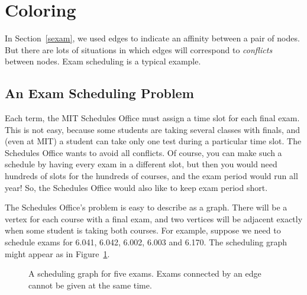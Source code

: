 
\begin{problems}
\practiceproblems
{}

\classproblems
{}

\examproblems
{}

\homeworkproblems
{}
\end{problems}

\section{Coloring}\label{sec:coloring}

In Section~\ref{sexam}, we used edges to indicate an affinity between a
pair of nodes.  But there are lots of situations in which edges will
correspond to \emph{conflicts} between nodes.  Exam scheduling is a
typical example.

\subsection{An Exam Scheduling Problem}

Each term, the MIT Schedules Office must assign a time slot for each
final exam.  This is not easy, because some students are taking
several classes with finals, and (even at MIT) a student can take only
one test during a particular time slot.  The Schedules Office wants to
avoid all conflicts.  Of course, you can make such a schedule by
having every exam in a different slot, but then you would need
hundreds of slots for the hundreds of courses, and the exam period
would run all year!  So, the Schedules Office would also like to keep
exam period short.

The Schedules Office's problem is easy to describe as a graph.  There
will be a vertex for each course with a final exam, and two vertices
will be adjacent exactly when some student is taking both courses.
For example, suppose we need to schedule exams for 6.041, 6.042,
6.002, 6.003 and 6.170.  The scheduling graph might appear as in
Figure~\ref{fig:5R}.

\begin{figure}
\caption{A scheduling graph for five exams.  Exams connected by an
  edge cannot be given at the same time.}
\label{fig:5R}
\end{figure}

